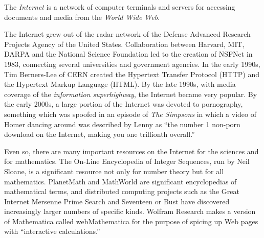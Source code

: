 \documentclass[12pt]{article}
\begin{document}
The {\em Internet} is a network of computer terminals and servers for accessing documents and media from the {\em World Wide Web}.

The Internet grew out of the radar network of the Defense Advanced Research Projects Agency of the United States. Collaboration between Harvard, MIT, DARPA and the National Science Foundation led to the creation of NSFNet in 1983, connecting several universities and government agencies. In the early 1990s, Tim Berners-Lee of CERN created the Hypertext Transfer Protocol (HTTP) and the Hypertext Markup Language (HTML). By the late 1990s, with media coverage of the {\em information superhighway}, the Internet became very popular. By the early 2000s, a large portion of the Internet was devoted to pornography, something which was spoofed in an episode of {\it The Simpsons} in which a video of Homer dancing around was described by Lenny as ``the number 1 non-porn download on the Internet, making you one trillionth overall.''

Even so, there are many important resources on the Internet for the sciences and for mathematics. The On-Line Encyclopedia of Integer Sequences, run by Neil Sloane, is a significant resource not only for number theory but for all mathematics. PlanetMath and MathWorld are significant encyclopedias of mathematical terms, and distributed computing projects such as the Great Internet Mersenne Prime Search and Seventeen or Bust have discovered increasingly larger numbers of specific kinds. Wolfram Research makes a version of Mathematica called webMathematica for the purpose of spicing up Web pages with ``interactive calculations.''
\end{document}
